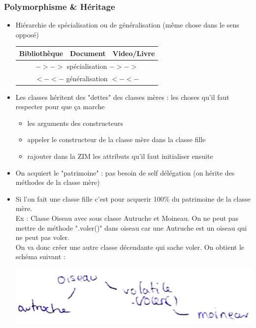 \documentclass[12pt,a4paper]{article}
\begin{document}
\subsubsection{Polymorphisme \& Héritage}
\begin{itemize}
\item Hiérarchie de spécialisation ou de généralisation (même chose dans le sens opposé)
\begin{center}
\begin{tabular}{|c|c|c|}
  \hline
  Bibliothèque & Document & Video/Livre \\ \hline
  \multicolumn{3}{|c|}{$-> ->$ spécialisation $-> ->$}\\\hline
  \multicolumn{3}{|c|}{$<- <-$ généralisation $<- <-$}\\\hline
\end{tabular}
\end{center}
\item Les classes héritent des "dettes" des classes mères : les choses qu'il faut respecter pour que ça marche
\begin{itemize}
\item les arguments des constructeurs
\item appeler le constructeur de la classe mère dans la classe fille
\item rajouter dans la ZIM les attributs qu'il faut initialiser ensuite
\end{itemize}
\item On acquiert le "patrimoine" : pas besoin de self délégation (on hérite des méthodes de la classe mère)
\item Si l'on fait une classe fille c'est pour acquerir 100\% du patrimoine de la classe mère.\\
Ex : Classe Oiseau avec sous classe Autruche et Moineau. On ne peut pas mettre de méthode ".voler()" dans oiseau car une Autruche est un oiseau qui ne peut pas voler.\\
On va donc créer une autre classe décendante qui sache voler. On obtient le schéma suivant :
\begin{center}
\includegraphics[scale=0.35]{sous-classe-oiseau}
\end{center}
\end{itemize}
\end{document}

